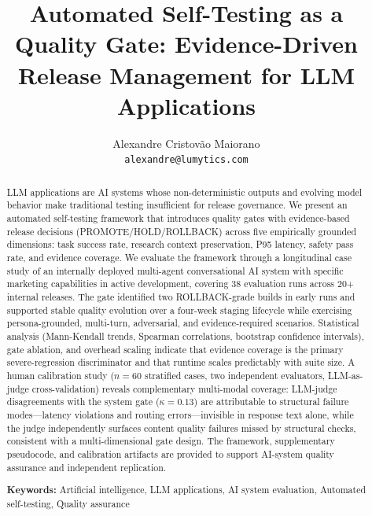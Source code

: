 \documentclass[twocolumn]{article}
\begin{document}
\title{Automated Self-Testing as a Quality Gate: Evidence-Driven Release Management for LLM Applications}

\author{Alexandre Cristov\~ao Maiorano\\
\texttt{alexandre@lumytics.com}
}

\date{}  %

\maketitle

\begin{abstract}
LLM applications are AI systems whose non-deterministic outputs and evolving model behavior make traditional testing insufficient for release governance. We present an automated self-testing framework that introduces quality gates with evidence-based release decisions (PROMOTE/HOLD/ROLLBACK) across five empirically grounded dimensions: task success rate, research context preservation, P95 latency, safety pass rate, and evidence coverage. We evaluate the framework through a longitudinal case study of an internally deployed multi-agent conversational AI system with specific marketing capabilities in active development, covering 38 evaluation runs across 20+ internal releases. The gate identified two ROLLBACK-grade builds in early runs and supported stable quality evolution over a four-week staging lifecycle while exercising persona-grounded, multi-turn, adversarial, and evidence-required scenarios. Statistical analysis (Mann-Kendall trends, Spearman correlations, bootstrap confidence intervals), gate ablation, and overhead scaling indicate that evidence coverage is the primary severe-regression discriminator and that runtime scales predictably with suite size. A human calibration study ($n=60$ stratified cases, two independent evaluators, LLM-as-judge cross-validation) reveals complementary multi-modal coverage: LLM-judge disagreements with the system gate ($\kappa=0.13$) are attributable to structural failure modes---latency violations and routing errors---invisible in response text alone, while the judge independently surfaces content quality failures missed by structural checks, consistent with a multi-dimensional gate design. The framework, supplementary pseudocode, and calibration artifacts are provided to support AI-system quality assurance and independent replication.

\noindent\textbf{Keywords:} Artificial intelligence, LLM applications, AI system evaluation, Automated self-testing, Quality assurance
\end{abstract}
\end{document}
